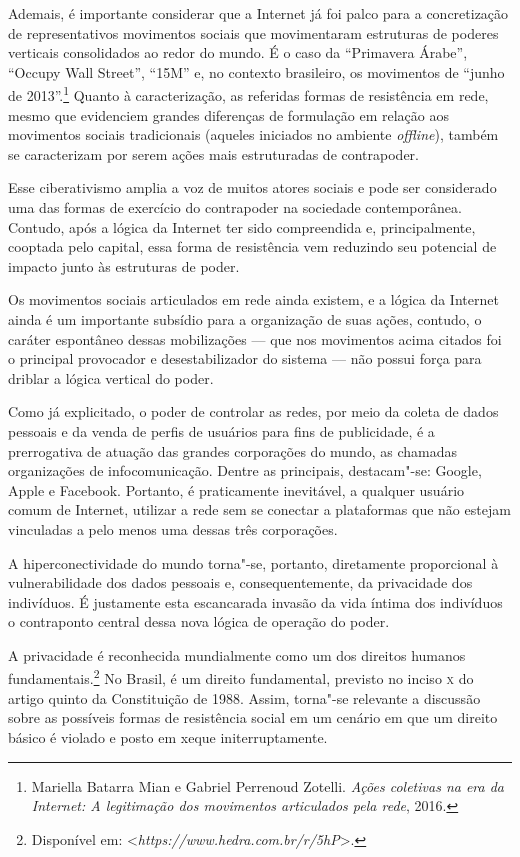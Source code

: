 Ademais, é importante considerar que a Internet já foi palco para a
concretização de representativos movimentos sociais que movimentaram
estruturas de poderes verticais consolidados ao redor do mundo. É o caso
da ``Primavera Árabe'', ``Occupy Wall Street'', ``15M'' e, no contexto
brasileiro, os movimentos de ``junho de 2013''.\footnote{Mariella Batarra Mian e  Gabriel Perrenoud Zotelli. \emph{Ações coletivas na era da Internet: A legitimação dos movimentos articulados pela rede}, 2016.}
Quanto à caracterização, as referidas formas de resistência em rede,
mesmo que evidenciem grandes diferenças de formulação em relação aos
movimentos sociais tradicionais (aqueles iniciados no ambiente
\emph{offline}), também se caracterizam por serem ações mais estruturadas de
contrapoder.

Esse ciberativismo amplia a voz de muitos atores sociais e pode ser
considerado uma das formas de exercício do contrapoder na sociedade
contemporânea. Contudo, após a lógica da Internet ter sido compreendida
e, principalmente, cooptada pelo capital, essa forma de resistência vem
reduzindo seu potencial de impacto junto às estruturas de poder.

Os movimentos sociais articulados em rede ainda existem, e a lógica da
Internet ainda é um importante subsídio para a organização de suas
ações, contudo, o caráter espontâneo dessas mobilizações --- que nos
movimentos acima citados foi o principal provocador e desestabilizador
do sistema --- não possui força para driblar a lógica vertical do poder.

Como já explicitado, o poder de controlar as redes, por meio da coleta
de dados pessoais e da venda de perfis de usuários para fins de
publicidade, é a prerrogativa de atuação das grandes corporações do
mundo, as chamadas organizações de infocomunicação. Dentre as
principais, destacam"-se: Google, Apple e Facebook. Portanto, é
praticamente inevitável, a qualquer usuário comum de Internet, utilizar
a rede sem se conectar a plataformas que não estejam vinculadas a pelo
menos uma dessas três corporações.

A hiperconectividade do mundo torna"-se, portanto, diretamente
proporcional à vulnerabilidade dos dados pessoais e, consequentemente,
da privacidade dos indivíduos. É justamente esta escancarada invasão da
vida íntima dos indivíduos o contraponto central dessa nova lógica de
operação do poder.

A privacidade é reconhecida mundialmente como um dos direitos humanos
fundamentais.\footnote{Disponível em: \textless{}\emph{https://www.hedra.com.br/r/5hP}\textgreater{}.} No Brasil, é um direito fundamental, previsto
no inciso \textsc{x} do artigo quinto da Constituição de 1988.
Assim, torna"-se relevante a discussão sobre as possíveis formas de
resistência social em um cenário em que um direito básico é violado e
posto em xeque initerruptamente.

